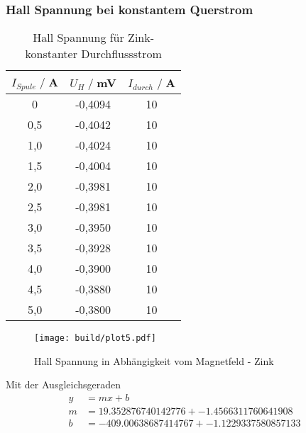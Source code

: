 \subsubsection{Hall Spannung bei konstantem Querstrom}
\begin{table}[H]
    \centering
    \begin{tabular}{c c c}
        \toprule
        $I_{Spule} \;/\;$A & $U_H\;/\;$mV & $I_{durch} \;/\;$A\\
        \midrule
            0                   &-0,4094&             10\\
            0,5                 &-0,4042&             10\\
            1,0                 &-0,4024&             10\\
            1,5                 &-0,4004&             10\\
            2,0                 &-0,3981&             10\\
            2,5                 &-0,3981&             10\\
            3,0                 &-0,3950&             10\\
            3,5                 &-0,3928&             10\\
            4,0                 &-0,3900&             10\\
            4,5                 &-0,3880&             10\\
            5,0                 &-0,3800&             10\\
        \bottomrule
    \end{tabular}
    \caption{Hall Spannung für Zink- konstanter Durchflussstrom}
    \label{tab:Zn_B}
\end{table}
\begin{figure}[H]
    \centering
    \texttt{[image: build/plot5.pdf]}
    \caption{Hall Spannung in Abhängigkeit vom Magnetfeld - Zink}
    \label{fig:Zn_B}
\end{figure}
Mit der Ausgleichsgeraden
\begin{align*}
    y &= mx + b\\
    m &= 19.352876740142776 +- 1.4566311760641908\\
    b &=  -409.00638687414767 +- 1.1229337580857133\\ %
\end{align*}

